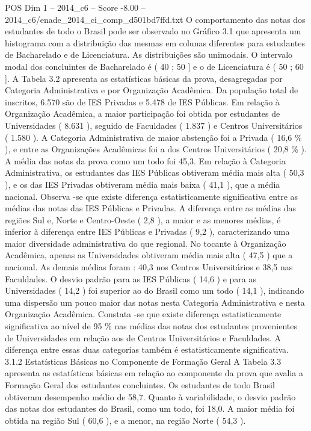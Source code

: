 \begin{textsample}{POS Dim 1 – 2014\_c6 – Score -8.00 – 2014\_c6/enade\_2014\_ci\_comp\_d501bd7ffd.txt}
O comportamento das notas dos estudantes de todo o Brasil pode ser observado no Gráfico 3.1 que apresenta um histograma com a distribuição das mesmas em colunas diferentes para estudantes de Bacharelado e de Licenciatura.
As distribuições são unimodais.
O intervalo modal dos concluintes de Bacharelado é ( 40 ; 50 ] e o de Licenciatura é ( 50 ; 60 ].
A Tabela 3.2 apresenta as estatísticas básicas da prova, desagregadas por Categoria Administrativa e por Organização Acadêmica.
Da população total de inscritos, 6.570 são de IES Privadas e 5.478 de IES Públicas.
Em relação à Organização Acadêmica, a maior participação foi obtida por estudantes de Universidades ( 8.631 ), seguido de Faculdades ( 1.837 ) e Centros Universitários ( 1.580 ).
A Categoria Administrativa de maior abstenção foi a Privada ( 16,6 \% ), e entre as Organizações Acadêmicas foi a dos Centros Universitários ( 20,8 \% ).
A média das notas da prova como um todo foi 45,3.
Em relação à Categoria Administrativa, os estudantes das IES Públicas obtiveram média mais alta ( 50,3 ), e os das IES Privadas obtiveram média mais baixa ( 41,1 ), que a média nacional.
Observa -se que existe diferença estatisticamente significativa entre as médias das notas das IES Públicas e Privadas.
A diferença entre as médias das regiões Sul e, Norte e Centro-Oeste ( 2,8 ), a maior e as menores médias, é inferior à diferença entre IES Públicas e Privadas ( 9,2 ), caracterizando uma maior diversidade administrativa do que regional.
No tocante à Organização Acadêmica, apenas as Universidades obtiveram média mais alta ( 47,5 ) que a nacional.
As demais médias foram : 40,3 nos Centros Universitários e 38,5 nas Faculdades.
O desvio padrão para as IES Públicas ( 14,6 ) e para as Universidades ( 14,2 ) foi superior ao do Brasil como um todo ( 14,1 ), indicando uma dispersão um pouco maior das notas nesta Categoria Administrativa e nesta Organização Acadêmica.
Constata -se que existe diferença estatisticamente significativa ao nível de 95 \% nas médias das notas dos estudantes provenientes de Universidades em relação aos de Centros Universitários e Faculdades.
A diferença entre essas duas categorias também é estatisticamente significativa. 3.1.2 Estatísticas Básicas no Componente de Formação Geral A Tabela 3.3 apresenta as estatísticas básicas em relação ao componente da prova que avalia a Formação Geral dos estudantes concluintes.
Os estudantes de todo Brasil obtiveram desempenho médio de 58,7.
Quanto à variabilidade, o desvio padrão das notas dos estudantes do Brasil, como um todo, foi 18,0.
A maior média foi obtida na região Sul ( 60,6 ), e a menor, na região Norte ( 54,3 ).

\end{textsample}
